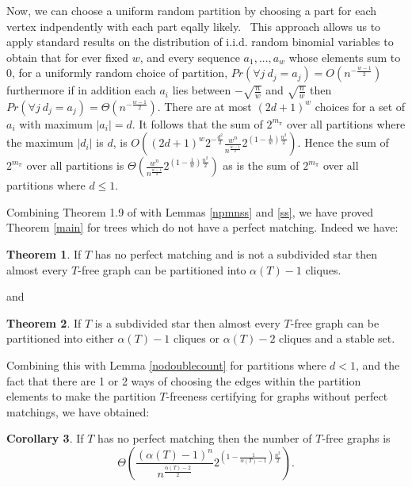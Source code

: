 \documentclass[12pt]{article}
\theoremstyle{definition}
\newtheorem{theorem}{Theorem}[section]
\newtheorem{corollary}[theorem]{Corollary}
\begin{document}
Now, we can choose a  uniform random partition by choosing a part for each vertex indpendently 
with each part eqally likely. \
 This approach allows us to apply standard results  on the distribution of  i.i.d. random  binomial variables to obtain that for  ever fixed $w$,  and every sequence $a_1,...,a_w$ whose elements sum to $0$,  for a uniformly random choice of partition, 
$Pr(  \forall j~ d_j=a_j)=O(n^{-\frac{w-1}{2}})$ furthermore if in addition each $a_i$ lies between $-\sqrt{\frac{n}{w}}$ and $\sqrt{\frac{n}{w}}$ then  $Pr( \forall j ~d_j=a_j)=\Theta(n^{-\frac{w-1}{2}})$. 
There are at most $(2d+1)^w$ choices for a set of $a_i$ with maximum $|a_i|=d$.
It follows that the sum of $2^{m_\pi}$ over all partitions where the maximum $|d_i|$ is $d$,
is $O((2d+1)^w2^{-\frac{d^2}{2}}\frac{w^n}{n^{\frac{w-1}{2}}}2^{(1-\frac{1}{w})\frac{n^2}{2}})$.
Hence the sum of $2^{m_\pi}$ over all partitions 
is $\Theta(\frac{w^n}{n^{\frac{w-1}{2}}}2^{(1-\frac{1}{w})\frac{n^2}{2}})$ as is the sum of $2^{m_\pi}$ over all partitions where $d \le 1$. 

Combining Theorem 1.9 of \cite{BB11} with Lemmas \ref{npmnss} and \ref{ss}, we have proved Theorem \ref{main} for trees which do not have a
perfect matching. Indeed we have: 

\begin{theorem}
\label{tnpmnsss}
If $T$ has no perfect matching and is not a subdivided star then almost every $T$-free graph can be partitioned into 
$\alpha(T)-1$ cliques.  
\end{theorem}

and


\begin{theorem}
\label{tss}
If $T$ is  a subdivided star then almost every $T$-free graph can be partitioned into either 
$\alpha(T)-1$ cliques or $\alpha(T)-2$ cliques and a stable set.   
\end{theorem}

Combining this with Lemma \ref{nodoublecount} for partitions where $d<1$,  and the fact that there are 1 or 2 ways of choosing the edges within the partition elements 
to make the partition  $T$-freeness certifying for graphs without perfect matchings, we have obtained: 


\begin{corollary}
\label{cnpm}
    If $T$ has no perfect matching then the number of $T$-free graphs is 
    \[\Theta\left(\frac{(\alpha(T)-1)^n}{n^{\frac{\alpha(T)-2}{2}}}2^{(1-\frac{1}{\alpha(T)-1})\frac{n^2}{2}}\right).\]
\end{corollary}
\end{document}
